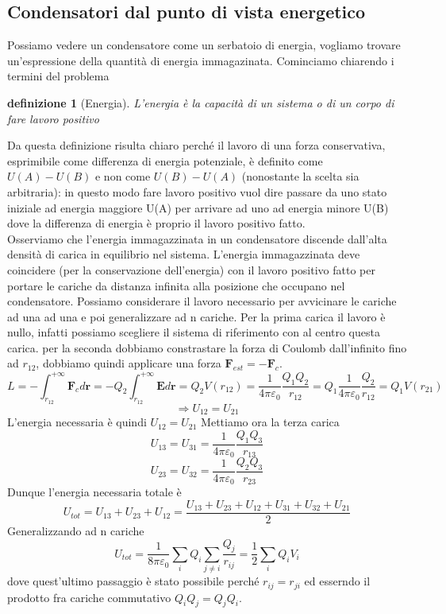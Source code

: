 \documentclass[10pt,a4paper]{article}
\newtheorem{definizione}{definizione}
\begin{document}
\subsection{Condensatori dal punto di vista energetico}
Possiamo vedere un condensatore come un serbatoio di energia, vogliamo trovare un'espressione della quantità di energia immagazinata. Cominciamo chiarendo i termini del problema
\begin{definizione}[Energia]
L'energia è la capacità di un sistema o di un corpo di fare lavoro positivo
\end{definizione}
Da questa definizione risulta chiaro perché il lavoro di una forza conservativa, esprimibile come differenza di energia potenziale, è definito come \(U(A)-U(B)\) e non come \(U(B)-U(A)\) (nonostante la scelta sia arbitraria): in questo modo fare lavoro positivo vuol dire passare da uno stato iniziale ad energia maggiore U(A) per arrivare ad uno ad energia minore U(B) dove la differenza di energia è proprio il lavoro positivo fatto.\\
Osserviamo che l'energia immagazzinata in un condensatore discende dall'alta densità di carica in equilibrio nel sistema. L'energia immagazzinata deve coincidere (per la conservazione dell'energia) con il lavoro positivo fatto per portare le cariche da distanza infinita alla posizione che occupano nel condensatore. Possiamo considerare il lavoro necessario per avvicinare le cariche ad una ad una e poi generalizzare ad n cariche. Per la prima carica il lavoro è nullo, infatti possiamo scegliere il sistema di riferimento con al centro questa carica. per la seconda dobbiamo constrastare la forza di Coulomb dall'infinito fino ad \(r_{12}\), dobbiamo quindi applicare una forza $\mathbf{F}_{est} = -\mathbf{F}_{c}$.
\[L = -\int_{r_12}^{+\infty}\mathbf{F}_{c}d\mathbf{r} = -Q_2\int_{r_12}^{+\infty}\mathbf{E}d\mathbf{r} = Q_2V(r_{12}) = \frac{1}{4\pi\varepsilon_0}\frac{Q_1 Q_2}{r_{12}} = Q_1\frac{1}{4\pi\varepsilon_0}\frac{ Q_2}{r_{12}} = Q_1V(r_{21}) \]
\[\Rightarrow U_{12} = U_{21}\]
L'energia necessaria è quindi \(U_{12} = U_{21}\) 
Mettiamo ora la terza carica 
\[U_{13} = U_{31} = \frac{1}{4\pi\varepsilon_0}\frac{Q_1 Q_3}{r_{13}}\]
\[U_{23} = U_{32} = \frac{1}{4\pi\varepsilon_0}\frac{Q_2 Q_3}{r_{23}}\]
Dunque l'energia necessaria totale è 
\[U_{tot} =U_{13} + U_{23} + U_{12}  = \frac{U_{13} + U_{23} + U_{12} + U_{31} + U_{32} + U_{21}}{2}\]
Generalizzando ad n cariche
\[U_{tot} =\frac{1}{8\pi\varepsilon_0} \sum_i Q_i\sum_{j\neq i} \frac{Q_j}{r_{ij}} = \frac{1}{2}\sum_i Q_i V_i\]
dove quest'ultimo passaggio è stato possibile perché \(r_{ij} = r_{ji}\) ed esserndo il prodotto fra cariche commutativo \(Q_iQ_j = Q_jQ_i\).\\
\end{document}
